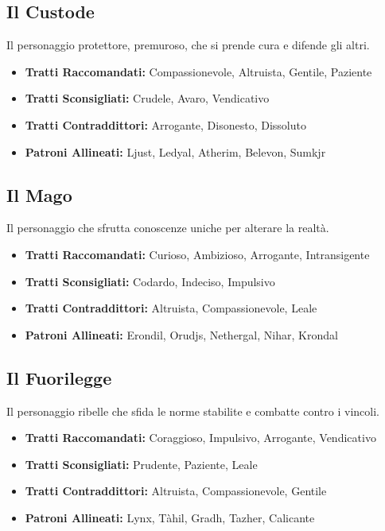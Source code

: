 \begin{multicols}{2}
\subsection*{Il Custode}
Il personaggio protettore, premuroso, che si prende cura e difende gli altri.

\noindent\begin{itemize}[leftmargin=*] \setlength{\itemsep}{0pt}
\item \textbf{Tratti Raccomandati:} Compassionevole, Altruista, Gentile, Paziente
\item \textbf{Tratti Sconsigliati:} Crudele, Avaro, Vendicativo
\item \textbf{Tratti Contraddittori:} Arrogante, Disonesto, Dissoluto
\item \textbf{Patroni Allineati:} Ljust, Ledyal, Atherim, Belevon, Sumkjr
\end{itemize}

\subsection*{Il Mago}
Il personaggio che sfrutta conoscenze uniche per alterare la realtà.

\noindent\begin{itemize}[leftmargin=*] \setlength{\itemsep}{0pt}
\item \textbf{Tratti Raccomandati:} Curioso, Ambizioso, Arrogante, Intransigente
\item \textbf{Tratti Sconsigliati:} Codardo, Indeciso, Impulsivo
\item \textbf{Tratti Contraddittori:} Altruista, Compassionevole, Leale
\item \textbf{Patroni Allineati:} Erondil, Orudjs, Nethergal, Nihar, Krondal
\end{itemize}

\subsection*{Il Fuorilegge}
Il personaggio ribelle che sfida le norme stabilite e combatte contro i vincoli.

\noindent\begin{itemize}[leftmargin=*] \setlength{\itemsep}{0pt}
\item \textbf{Tratti Raccomandati:} Coraggioso, Impulsivo, Arrogante, Vendicativo
\item \textbf{Tratti Sconsigliati:} Prudente, Paziente, Leale
\item \textbf{Tratti Contraddittori:} Altruista, Compassionevole, Gentile
\item \textbf{Patroni Allineati:} Lynx, Tàhil, Gradh, Tazher, Calicante
\end{itemize}


\end{multicols}
